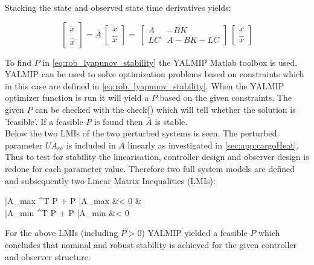 \noindent Stacking the state and observed state time derivatives yields:

\begin{equation} \label{eq:rob_stacked_sys}
	\begin{bmatrix}
		\dot{x} \\ \dot{\hat{x}}
	\end{bmatrix} = \bar{A}\
	\begin{bmatrix}
	x \\ \hat{x}
	\end{bmatrix} = \
	\begin{bmatrix}
		A & -BK \\ LC & A-BK-LC
	\end{bmatrix} \
	\begin{bmatrix}
		x \\ \hat{x}
	\end{bmatrix}
\end{equation}

\noindent To find $P$ in \cref{eq:rob_lyapunov_stability} the YALMIP Matlab toolbox is used. YALMIP can be used to solve optimization problems based on constraints which in this case are defined in \cref{eq:rob_lyapunov_stability}. When the YALMIP optimizer function is run it will yield a $P$ based on the given constraints. The given $P$ can be checked with the check() which will tell whether the solution is 'feasible'. If a feasible $P$ is found then $\bar{A}$ is stable.\\

Below the two LMIs of the two perturbed systems is seen. The perturbed parameter $U A_{ca}$ is included in $\bar{A}$ linearly as investigated in \cref{sec:app:cargoHeat}. Thus to test for stability the linearisation, controller design and observer design is redone for each parameter value. Therefore two full system models are defined and subsequently two Linear Matrix Inequalities (LMIs):

\begin{flalign}
	\hspace{1cm} \bar{A}_{\Delta max} \! ^T \: P + P \:\bar{A}_{\Delta max} &< 0 \text{, $\;$ (+20\% perturbation on $U A_{ca}$)} &\\
	\hspace{1cm} \bar{A}_{\Delta min} \! ^T \: P + P \:\bar{A}_{\Delta min} &< 0 
\end{flalign}

\noindent For the above LMIs (including $P > 0$) YALMIP yielded a feasible $P$ which concludes that nominal and robust stability is achieved for the given controller and observer structure.

